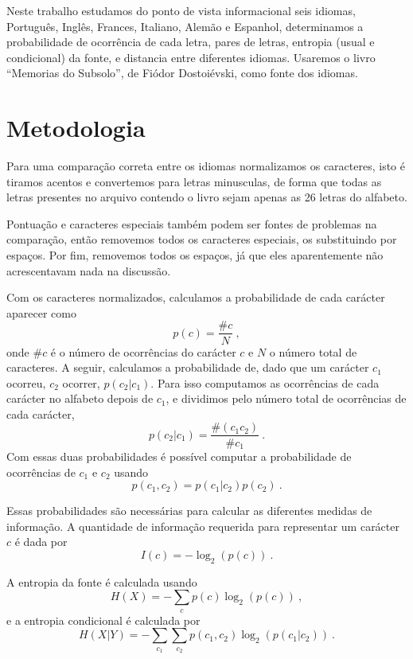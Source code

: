 \documentclass[aps, 10pt, twocolumn, prb, longbibliography, superscriptaddress]{revtex4-2}
\begin{document}
Neste trabalho estudamos do ponto de vista informacional
seis idiomas, Português, Inglês, Frances, Italiano, Alemão e Espanhol,
determinamos a probabilidade de ocorrência de cada letra,
pares de letras, entropia (usual e condicional) da fonte, e distancia
entre diferentes idiomas. Usaremos o livro ``Memorias do Subsolo'',
de Fiódor Dostoiévski, como fonte dos idiomas.

\section{Metodologia}

Para uma comparação correta entre os idiomas
normalizamos os caracteres, isto é tiramos
acentos e convertemos para letras minusculas,
de forma que todas as letras presentes no arquivo
contendo o livro sejam apenas as 26 letras do alfabeto.

Pontuação e caracteres especiais também podem ser
fontes de problemas na comparação, então removemos
todos os caracteres especiais, os substituindo por
espaços. Por fim, removemos todos os espaços, já que
eles aparentemente não acrescentavam nada na discussão.

Com os caracteres normalizados, calculamos
a probabilidade de cada carácter aparecer como
\begin{equation}
  p(c)=\frac{\#c}{N} \ ,
\end{equation}
onde $\#c$ é o número de ocorrências do carácter $c$
e $N$ o número total de caracteres.
A seguir, calculamos a probabilidade de, dado que um
carácter $c_1$ ocorreu, $c_2$ ocorrer, $p(c_2|c_1)$.
Para isso computamos as ocorrências de cada carácter
no alfabeto depois de $c_1$, e dividimos pelo número
total de ocorrências de cada carácter,
\begin{equation}
  p(c_2|c_1)=\frac{\#(c_1c_2)}{\#c_1} \ .
\end{equation}
Com essas duas probabilidades é possível computar
a probabilidade de ocorrências de $c_1$ e $c_2$
usando
\begin{equation}
  p(c_1, c_2)=p(c_1|c_2)p(c_2) \ .
\end{equation}

Essas probabilidades são necessárias para calcular as
diferentes medidas de informação.
A quantidade de informação requerida para representar
um carácter $c$ é dada por
\begin{equation}
  I(c)=-\log_2(p(c)) \ .
\end{equation}

A entropia da fonte é calculada usando
\begin{equation}
  H(X)=-\sum_cp(c)\log_2(p(c)) \ ,
\end{equation}
e a entropia condicional é calculada por
\begin{equation}
  H(X|Y)=-\sum_{c_1}\sum_{c_2}p(c_1, c_2)\log_2(p(c_1|c_2)) \ .
\end{equation}
\end{document}
